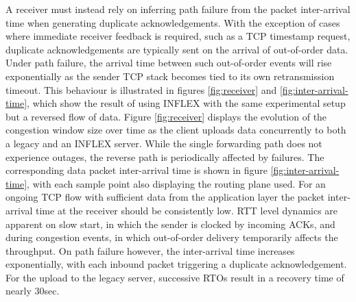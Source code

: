 A receiver must instead rely on inferring path failure from the packet inter-arrival time when generating duplicate acknowledgements.
With the exception of cases where immediate receiver feedback is required, such as a \ac{TCP} timestamp request, duplicate acknowledgements are typically sent on the arrival of out-of-order data.
Under path failure, the arrival time between such out-of-order events will rise exponentially as the sender \ac{TCP} stack becomes tied to its own retransmission timeout.
This behaviour is illustrated in figures \ref{fig:receiver} and \ref{fig:inter-arrival-time}, which show the result of using INFLEX with the same experimental setup but a reversed flow of data.
Figure \ref{fig:receiver} displays the evolution of the congestion window size over time as the client uploads data concurrently to both a legacy and an INFLEX server.
While the single forwarding path does not experience outages, the reverse path is periodically affected by failures.
The corresponding data packet inter-arrival time is shown in figure \ref{fig:inter-arrival-time}, with each sample point also displaying the routing plane used.
For an ongoing \ac{TCP} flow with sufficient data from the application layer the packet inter-arrival time at the receiver should be consistently low.
RTT level dynamics are apparent on slow start, in which the sender is clocked by incoming \acp{ACK}, and during congestion events, in which out-of-order delivery temporarily affects the throughput.
On path failure however, the inter-arrival time increases exponentially, with each inbound packet triggering a duplicate acknowledgement.
For the upload to the legacy server, successive \acp{RTO} result in a recovery time of nearly $30$sec.

